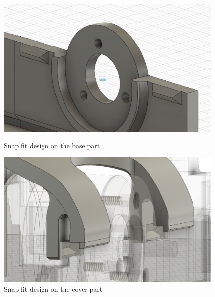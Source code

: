 \begin{figure}[htb]
    \centering
    \begin{minipage}{.45\textwidth}
          \centering
            \includegraphics[width=.9\linewidth]{figures/Casing/SnapFitBase.PNG}
              \caption{Snap fit design on the base part}
                \label{fig:SnapFitBase}
    \end{minipage}
    \begin{minipage}{.45\textwidth}
          \centering
            \includegraphics[width=.9\linewidth]{figures/Casing/SnapFitCover.PNG}
              \caption{Snap fit design on the cover part}
                \label{fig:SnapFitCover}
    \end{minipage}
\end{figure}

